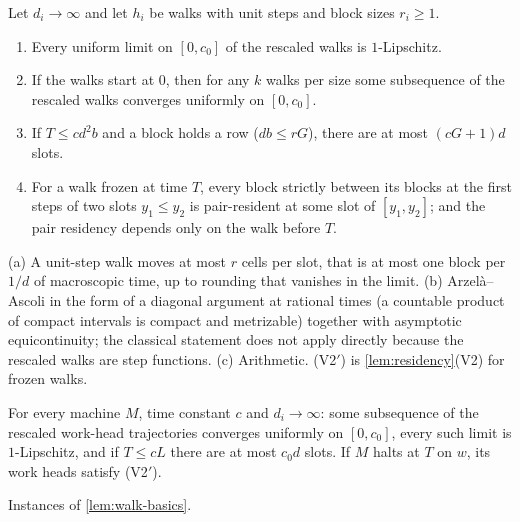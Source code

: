 \begin{lemma}\label{lem:walk-basics}
Let $d_i\to\infty$ and let $h_i$ be walks with unit steps and block sizes $r_i\ge1$.
\begin{enumerate}[label=(\alph*)]
\item Every uniform limit on $[0,c_0]$ of the rescaled walks is $1$-Lipschitz.
\item If the walks start at $0$, then for any $k$ walks per size some subsequence of the rescaled
walks converges uniformly on $[0,c_0]$.
\item If $T\le cd^2b$ and a block holds a row ($db\le rG$), there are at most $(cG+1)d$ slots.
\item[(V2$'$)] For a walk frozen at time $T$, every block strictly between its blocks at the first
steps of two slots $y_1\le y_2$ is pair-resident at some slot of $[y_1,y_2]$; and the pair residency
depends only on the walk before $T$.
\end{enumerate}
\end{lemma}

\begin{outline}
(a) A unit-step walk moves at most $r$ cells per slot, that is at most one block per $1/d$ of
macroscopic time, up to rounding that vanishes in the limit. (b) Arzelà--Ascoli in the form of a
diagonal argument at rational times (a countable product of compact intervals is compact and
metrizable) together with asymptotic equicontinuity; the classical statement does not apply
directly because the rescaled walks are step functions. (c) Arithmetic. (V2$'$) is
\cref{lem:residency}(V2) for frozen walks.
\end{outline}

\begin{lemma}\label{lem:machine-walks}
For every machine $M$, time constant $c$ and $d_i\to\infty$: some subsequence of the rescaled
work-head trajectories converges uniformly on $[0,c_0]$, every such limit is $1$-Lipschitz, and if
$T\le cL$ there are at most $c_0d$ slots. If $M$ halts at $T$ on $w$, its work heads satisfy
(V2$'$).
\end{lemma}

\begin{outline}
Instances of \cref{lem:walk-basics}.
\end{outline}

